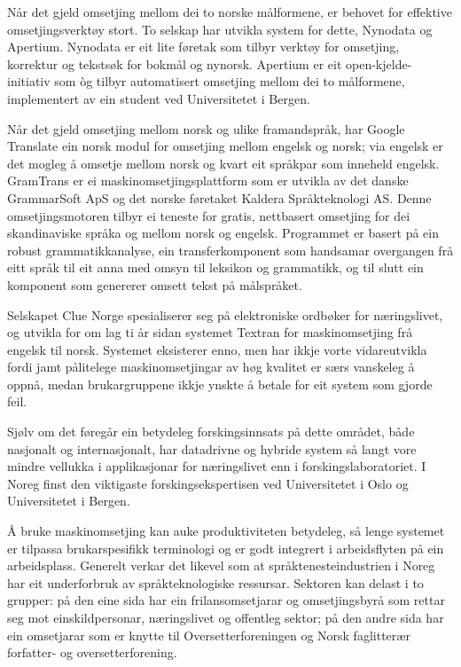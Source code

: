 \begin{multicols}{2}

Når det gjeld omsetjing mellom dei to norske målformene, er behovet for effektive omsetjingsverktøy stort. To selskap har utvikla system for dette, Nynodata og Apertium. Nynodata er eit lite føretak som tilbyr verktøy for omsetjing, korrektur og tekstsøk for bokmål og nynorsk. Apertium er eit open-kjelde-initiativ som òg tilbyr automatisert omsetjing mellom dei to målformene, implementert av ein student ved Universitetet i Bergen.

Når det gjeld omsetjing mellom norsk og ulike framandspråk, har Google Translate ein norsk modul for omsetjing mellom engelsk og norsk; via engelsk er det mogleg å omsetje mellom norsk og kvart eit språkpar som inneheld engelsk. GramTrans er ei maskinomsetjingsplattform som er utvikla av det danske GrammarSoft ApS og det norske føretaket Kaldera Språkteknologi AS. Denne omsetjingsmotoren tilbyr ei teneste for gratis, nettbasert omsetjing for dei skandinaviske språka og mellom norsk og engelsk. Programmet er basert på ein robust grammatikkanalyse, ein transferkomponent som handsamar overgangen frå eitt språk til eit anna med omsyn til leksikon og grammatikk, og til slutt ein komponent som genererer omsett tekst på målspråket. 

Selskapet Clue Norge spesialiserer seg på elektroniske ordbøker for næringslivet, og utvikla for om lag ti år sidan systemet Textran for maskinomsetjing frå engelsk til norsk. Systemet eksisterer enno, men har ikkje vorte vidareutvikla fordi jamt pålitelege maskinomsetjingar av høg kvalitet er særs vanskeleg å oppnå, medan brukargruppene ikkje ynskte å betale for eit system som gjorde feil.

Sjølv om det føregår ein betydeleg forskingsinnsats på dette området, både nasjonalt og internasjonalt, har datadrivne og hybride system så langt vore mindre vellukka i applikasjonar for næringslivet enn i forskingslaboratoriet. I Noreg finst den viktigaste forskingsekspertisen ved Universitetet i Oslo og Universitetet i Bergen.


Å bruke maskinomsetjing kan auke produktiviteten betydeleg, så lenge systemet er tilpassa brukarspesifikk terminologi og er godt integrert i arbeidsflyten på ein arbeidsplass. Generelt verkar det likevel som at språktenesteindustrien i Noreg har eit underforbruk av språkteknologiske ressursar. 
Sektoren kan delast i to grupper: på den eine sida har ein frilansomsetjarar og omsetjingsbyrå som rettar seg mot einskildpersonar, næringslivet og offentleg sektor; på den andre sida har ein omsetjarar som er knytte til Oversetterforeningen og Norsk faglitterær forfatter- og oversetterforening.


\end{multicols}
